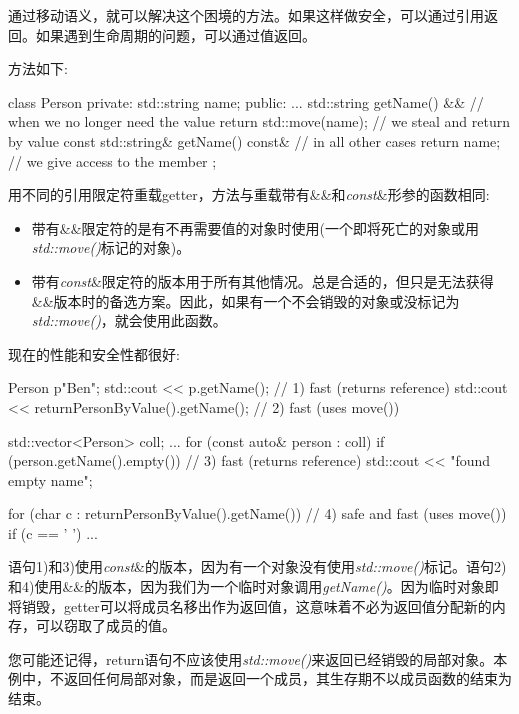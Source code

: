 通过移动语义，就可以解决这个困境的方法。如果这样做安全，可以通过引用返回。如果遇到生命周期的问题，可以通过值返回。\par

方法如下:\par

\begin{codebox}[cpp]
class Person
{
private:
  std::string name;
public:
  ...
  std::string getName() && { // when we no longer need the value
    return std::move(name); // we steal and return by value
  }
  const std::string& getName() const& { // in all other cases
    return name; // we give access to the member
  }
};
\end{codebox}

用不同的引用限定符重载getter，方法与重载带有\&\&和\textit{const}\&形参的函数相同:\par

\begin{itemize}
  \item 带有\&\&限定符的是有不再需要值的对象时使用(一个即将死亡的对象或用\textit{std::move()}标记的对象)。
  \item 带有\textit{const}\&限定符的版本用于所有其他情况。总是合适的，但只是无法获得\&\&版本时的备选方案。因此，如果有一个不会销毁的对象或没标记为\textit{std::move()}，就会使用此函数。
\end{itemize}

现在的性能和安全性都很好:\par

\begin{codebox}[cpp]
Person p{"Ben"};
std::cout << p.getName(); // 1) fast (returns reference)
std::cout << returnPersonByValue().getName(); // 2) fast (uses move())

std::vector<Person> coll;
...
for (const auto& person : coll) {
  if (person.getName().empty()) { // 3) fast (returns reference)
    std::cout << "found empty name\n";
  }
}

for (char c : returnPersonByValue().getName()) { // 4) safe and fast (uses move())
  if (c == ' ') {
    ...
  }
}
\end{codebox}

语句1)和3)使用\textit{const}\&的版本，因为有一个对象没有使用\textit{std::move()}标记。语句2)和4)使用\&\&的版本，因为我们为一个临时对象调用\textit{getName()}。因为临时对象即将销毁，getter可以将成员名移出作为返回值，这意味着不必为返回值分配新的内存，可以窃取了成员的值。\par

您可能还记得，return语句不应该使用\textit{std::move()}来返回已经销毁的局部对象。本例中，不返回任何局部对象，而是返回一个成员，其生存期不以成员函数的结束为结束。\par

